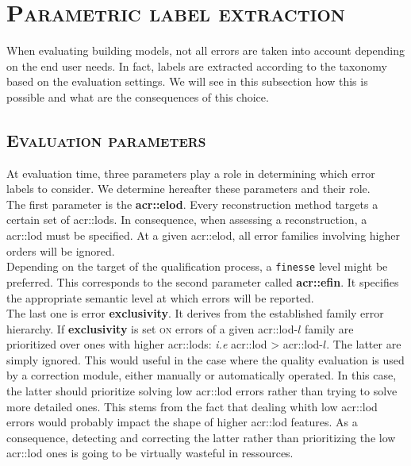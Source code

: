 \section{\textsc{Parametric label extraction}}
    \label{sec::semantic_evaluation::label_extraction}
    When evaluating building models, not all errors are taken into account depending on the end user needs.
    In fact, labels are extracted according to the taxonomy based on the evaluation settings.
    We will see in this subsection how this is possible and what are the consequences of this choice.

    \subsection{\textsc{Evaluation parameters}}
        At evaluation time, three parameters play a role in determining which error labels to consider.
        We determine hereafter these parameters and their role.\\

        The first parameter is the \textbf{\gls{acr::elod}}.
        Every reconstruction method targets a certain set of \glspl{acr::lod}.
        In consequence, when assessing a reconstruction, a \gls{acr::lod} must be specified.
        At a given \gls{acr::elod}, all error families involving higher orders will be ignored.\\
        Depending on the target of the qualification process, a \texttt{finesse} level might be preferred.
        This corresponds to the second parameter called \textbf{\gls{acr::efin}}.
        It specifies the appropriate semantic level at which errors will be reported.\\
        The last one is error \textbf{exclusivity}.
        It derives from the established family error hierarchy.
        If \textbf{exclusivity} is set \textsc{on} errors of a given \gls{acr::lod}-$l$ family are prioritized over ones with higher \glspl{acr::lod}: \textit{i.e} \gls{acr::lod} > \gls{acr::lod}-$l$.
        The latter are simply ignored.
        This would useful in the case where the quality evaluation is used by a correction module, either manually or automatically operated.
        In this case, the latter should prioritize solving low \gls{acr::lod} errors rather than trying to solve more detailed ones.
        This stems from the fact that dealing whith low \gls{acr::lod} errors would probably impact the shape of higher \gls{acr::lod} features.
        As a consequence, detecting and correcting the latter rather than prioritizing the low \gls{acr::lod} ones is going to be virtually wasteful in ressources.

